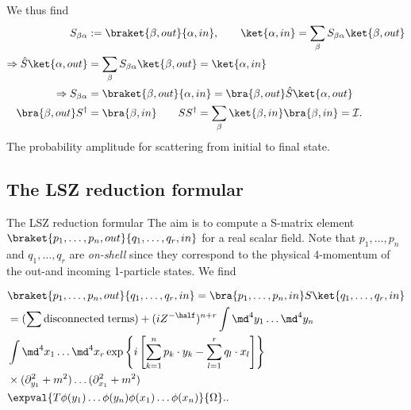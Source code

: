 We thus find
\begin{align}
	S_{\beta \alpha} &:= \braket{\beta,out}{\alpha,in}, \qquad \ket{\alpha,in} = \sum_{\beta} S_{\beta \alpha} \ket{\beta,out}\\
	\Rightarrow \hat{S}\ket{\alpha,out} &=\sum_{\beta} S_{\beta \alpha} \ket{\beta,out} = \ket{\alpha,in} \\
	\Rightarrow S_{\beta \alpha} &= \braket{\beta,out}{\alpha,in} = \bra{\beta,out} \hat{S}\ket{\alpha,out}\\
	\bra{\beta,out}S^{\dagger} &= \bra{\beta,in} \qquad SS^{\dagger}=\sum_{\beta} \ket{\beta,in}\bra{\beta,in} = \mathcal{I}.
\end{align}
The probability amplitude for scattering from initial to final state.

\subsection{The LSZ reduction formular}
\begin{mybox}{The LSZ reduction formular}
The aim is to compute a S-matrix element $\braket{p_1,\dots,p_n,out}{q_1,\dots,q_r,in}$ for a real scalar field. Note that $p_1,\dots,p_n$ and $q_1,\dots,q_r$ are \emph{on-shell} since they correspond to the physical 4-momentum of the out-and incoming 1-particle states. We find

\begin{align*}
	&\braket{p_1,\dots,p_n,out}{q_1,\dots,q_r,in}= \bra{p_1,\dots,p_n, in}S\ket{q_1,\dots,q_r,in} \\
	&= (\sum \mathrm{disconnected \;terms}) +(i Z^{-\half})^{n+r} \int \md^4 y_1 \dots \md^4 y_n\\
	& \int \md^4 x_1 \dots \md^4 x_r \exp\left\{i\left[\sum_{k=1}^{n} p_k \cdot y_k - \sum_{l=1}^{r} q_l \cdot x_l\right]\right\} \\
	&\times (\partial^2_{y_1} + m^2) \dots (\partial^2_{x_1} +m^2) \\
	&\expval{T\phi(y_1) \dots \phi(y_n) \phi(x_1)\dots \phi(x_n)}{\Omega}..
\end{align*}
\end{mybox}
